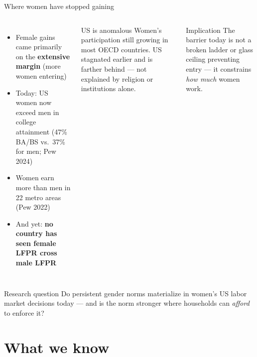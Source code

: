 \documentclass[10pt,aspectratio=169]{beamer}
\begin{document}
\begin{frame}{Where women have stopped gaining}
  \begin{columns}[c]
      \begin{itemize}
        \item Female gains came primarily on the \textbf{extensive margin}
              (more women entering) \citep{SaezGethin2026}
        \item Today: US women now exceed men in college attainment
              (47\% BA/BS vs.\ 37\% for men; Pew 2024)
        \item Women earn more than men in 22 metro areas (Pew 2022)
        \item And yet: \textbf{no country has seen female LFPR cross male LFPR}
      \end{itemize}
      \begin{exampleblock}{US is anomalous}
        Women's participation still growing in most OECD countries.
        US stagnated earlier and is farther behind — not explained
        by religion or institutions alone.
      \end{exampleblock}
      \medskip
      \begin{alertblock}{Implication}
        The barrier today is not a broken ladder or glass ceiling
        preventing entry — it constrains \emph{how much} women work.
      \end{alertblock}
  \end{columns}
\end{frame}

\begin{standinenv}
\begin{frame}{Research question}
  Do persistent gender norms materialize in women's US labor market
  decisions today — and is the norm stronger where households
  can \emph{afford} to enforce it?
\end{frame}
\end{standinenv}

\section{What we know}
\end{document}

